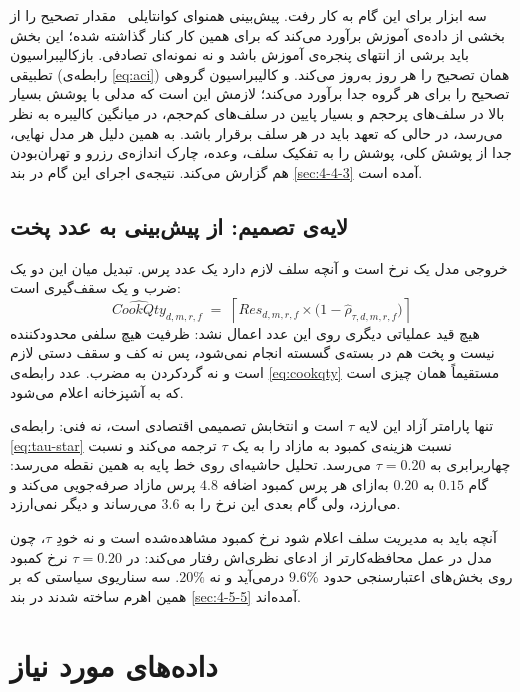 سه ابزار برای این گام به کار رفت. پیش‌بینی همنوای کوانتایلی~\cite{Romano19cqr} مقدار
تصحیح را از بخشی از داده‌ی آموزش برآورد می‌کند که برای همین کار کنار گذاشته شده؛ این
بخش باید برشی از انتهای پنجره‌ی آموزش باشد و نه نمونه‌ای تصادفی. بازکالیبراسیون تطبیقی
(رابطه‌ی \ref{eq:aci}) همان تصحیح را هر روز به‌روز می‌کند. و کالیبراسیون
گروهی تصحیح را برای هر گروه جدا برآورد
می‌کند؛ لازمش این است که مدلی با پوشش بسیار بالا در سلف‌های پرحجم و بسیار پایین در
سلف‌های کم‌حجم، در میانگین کالیبره به نظر می‌رسد، در حالی که تعهد باید در هر سلف برقرار
باشد. به همین دلیل هر مدل نهایی، جدا از پوشش کلی، پوشش را به تفکیک سلف، وعده، چارک
اندازه‌ی رزرو و تهران‌بودن هم گزارش می‌کند. نتیجه‌ی اجرای این گام در بند
\ref{sec:4-4-3} آمده است.

\subsection{لایه‌ی تصمیم: از پیش‌بینی به عدد پخت}
\label{sec:3-2-6}

خروجی مدل یک نرخ است و آنچه سلف لازم دارد یک عدد پرس. تبدیل میان این دو یک ضرب و یک
سقف‌گیری است:
\begin{equation}
\widehat{CookQty}_{d,m,r,f} \;=\; \left\lceil Res_{d,m,r,f} \times
\big(1-\hat\rho_{\tau,d,m,r,f}\big) \right\rceil
\label{eq:cookqty}
\end{equation}
هیچ قید عملیاتی دیگری روی این عدد اعمال نشد: ظرفیت هیچ سلفی محدودکننده نیست و پخت هم
در بسته‌ی گسسته انجام نمی‌شود، پس نه کف و سقف دستی لازم است و نه گردکردن به مضرب. عدد
رابطه‌ی \ref{eq:cookqty} مستقیماً همان چیزی است که به آشپزخانه اعلام می‌شود.

تنها پارامتر آزاد این لایه $\tau$ است و انتخابش تصمیمی اقتصادی است، نه فنی: رابطه‌ی
\ref{eq:tau-star} نسبت هزینه‌ی کمبود به مازاد را به یک $\tau$ ترجمه می‌کند و نسبت
چهاربرابری به $\tau = 0.20$ می‌رسد. تحلیل حاشیه‌ای روی خط پایه به همین نقطه می‌رسد: گام
$0.15$ به $0.20$ به‌ازای هر پرس کمبود اضافه $4.8$ پرس مازاد صرفه‌جویی می‌کند و می‌ارزد،
ولی گام بعدی این نرخ را به $3.6$ می‌رساند و دیگر نمی‌ارزد.

آنچه باید به مدیریت سلف اعلام شود نرخ کمبود مشاهده‌شده است و نه خودِ $\tau$، چون مدل در
عمل محافظه‌کارتر از ادعای نظری‌اش رفتار می‌کند: در $\tau = 0.20$ نرخ کمبود روی بخش‌های
اعتبارسنجی حدود $9.6\%$ درمی‌آید و نه $20\%$. سه سناریوی سیاستی که بر همین اهرم ساخته
شدند در بند \ref{sec:4-5-5} آمده‌اند.

\section{داده‌های مورد نیاز}
\label{sec:3-3}

